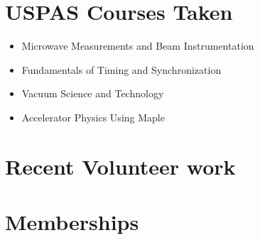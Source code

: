 \documentclass[11pt,a4paper,sans]{moderncv}        %
\begin{document}
\section{USPAS Courses Taken}
\begin{itemize}
	\item {Microwave Measurements and Beam Instrumentation}
	\item {Fundamentals of Timing and Synchronization}
	\item {Vacuum Science and Technology}
	\item {Accelerator Physics Using Maple}
\end{itemize}
\fi

\section{Recent Volunteer work}


\section{Memberships}

\iffalse
\section{References}
\begin{cvcolumns}
  \cvcolumn{Category 1}{\begin{itemize}\item Linda Spentzouris \item John Power \item Larry Pinsky \end{itemize}}
  \cvcolumn{Category 2}{Amongst others:\begin{itemize}\item Person 1, and\item Person 2\end{itemize}(more upon request)}
  \cvcolumn[0.5]{All the rest \& some more}{\textit{That} person, and \textbf{those} also (all available upon request).}
\end{cvcolumns}
\fi


\clearpage


\end{document}
